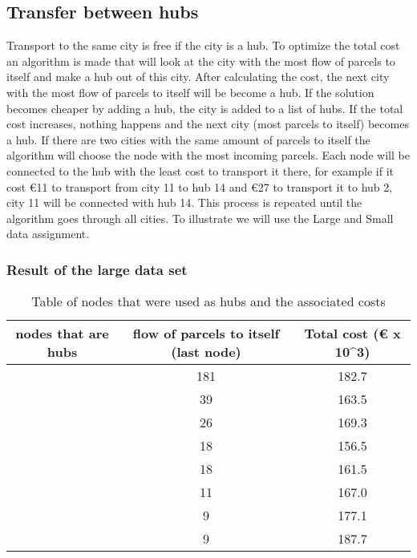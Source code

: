 \documentclass{article}
\begin{document}
    \subsection{Transfer between hubs} \label{sssec:num1}
        Transport to the same city is free if the city is a hub. To optimize the total cost an algorithm is made that will look at the city with the most flow of parcels to itself and make a hub out of this city. After calculating the cost, the next city with the most flow of parcels to itself will be become a hub. If the solution becomes cheaper by adding a hub, the city is added to a list of hubs. If the total cost increases, nothing happens and the next city (most parcels to itself) becomes a hub. If there are two cities with the same amount of parcels to itself the algorithm will choose the node with the most incoming parcels. Each node will be connected to the hub with the least cost to transport it there, for example if it cost €11 to transport from city 11 to hub 14 and €27 to transport it to hub 2, city 11 will be connected with hub 14. This process is repeated until the algorithm goes through all cities. To illustrate we will use the Large and Small data assignment.

\subsubsection{Result of the large data set}
        \begin{table}[h!]
            \begin{tabular}{||c|c|c||}
                \hline
                nodes that are hubs & flow of parcels to itself (last node) & Total cost (€ x 10^3)\\
                \hline
                [14] &  181 & 182.7 \\
                \hline
                [14,2]   & 39 & 163.5 \\
                \hline
                [14,2,15] & 26 & 169.3 \\
                \hline
                [14,2,15,6]  & 18 & 156.5 \\
                \hline
                [14,2,15,6,13] & 18 & 161.5\\
                \hline
                [14,2,15,6,13,4] & 11 & 167.0   \\
                \hline
                [14,2,15,6,13,4,3] & 9 & 177.1   \\
                \hline
                [14,2,15,6,13,4,3,9] & 9 & 187.7    \\
                \hline
            \end{tabular}
        \caption{Table of nodes that were used as hubs and the associated costs}
        \end{table}
\end{document}
